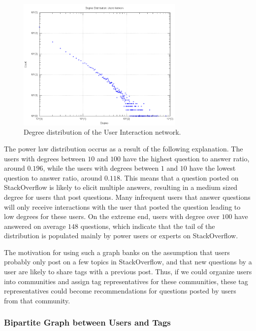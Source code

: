\documentclass[10pt]{IEEEtran}
\begin{document}
\begin{figure}[h]
  \centering
    \includegraphics[width=3.2in]{user_degdistr.png}
  \caption{Degree distribution of the User Interaction network.}
  \label{fig:user_dd}
\end{figure}

The power law distribution occrus as a result of the following explanation. The users with degrees between $10$ and $100$ have the highest question to answer ratio, around $0.196$, while the users with degrees between $1$ and $10$ have the lowest question to answer ratio, around $0.118$. This means that a question posted on StackOverflow is likely to elicit multiple answers, resulting in a medium sized degree for users that post questions. Many infrequent users that answer questions will only receive interactions with the user that posted the question leading to low degrees for these users. On the extreme end, users with degree over $100$ have answered on average $148$ questions, which indicate that the tail of the distribution is populated mainly by power users or experts on StackOverflow.

The motivation for using such a graph banks on the assumption that users probably only post on a few topics in StackOverflow, and that new questions by a user are likely to share tags with a previous post. Thus, if we could organize users into communities and assign tag representatives for these communities, these tag representatives could become recommendations for questions posted by users from that community.


\subsubsection{Bipartite Graph between Users and Tags}
\end{document}
